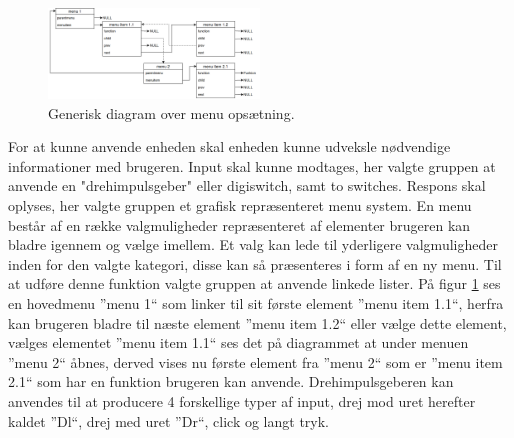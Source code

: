 \begin{figure}
	\centering 
	\includegraphics[width=0.5\textwidth]{billeder/menuesdiagram.png} 
	\caption{Generisk diagram over menu opsætning. } 
	\label{fig:menuesdiagram} 
\end{figure}
For at kunne anvende enheden skal enheden kunne udveksle nødvendige informationer med brugeren. 
Input skal kunne modtages, her valgte gruppen at anvende en "drehimpulsgeber" eller digiswitch, samt to switches.
Respons skal oplyses, her valgte gruppen et grafisk repræsenteret menu system.
En menu består af en række valgmuligheder repræsenteret af elementer brugeren kan bladre igennem og vælge imellem.
Et valg kan lede til yderligere valgmuligheder inden for den valgte kategori, disse kan så præsenteres i form af en ny menu.
Til at udføre denne funktion valgte gruppen at anvende linkede lister.\newline
På figur \ref{fig:menuesdiagram} ses en hovedmenu ''menu 1`` som linker til sit første element ''menu item 1.1``, herfra kan brugeren bladre til næste element ''menu item 1.2`` eller vælge dette element, vælges elementet ''menu item 1.1`` ses det på diagrammet at under menuen ''menu 2`` åbnes, derved vises nu første element fra ''menu 2`` som er ''menu item 2.1`` som har en funktion brugeren kan anvende.
Drehimpulsgeberen kan anvendes til at producere 4 forskellige typer af input, drej mod uret herefter kaldet ''Dl``, drej med uret ''Dr``, click og langt tryk.

